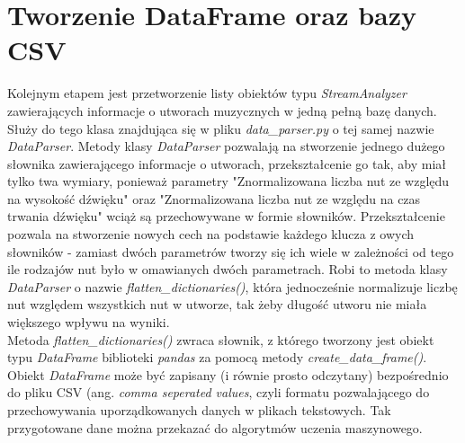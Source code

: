 \documentclass[printmode, eng]{mgr}
\newcommand\tab[1][1cm]{\hspace*{#1}}
\begin{document}
\section{Tworzenie DataFrame oraz bazy CSV}
\tab Kolejnym etapem jest przetworzenie listy obiektów typu \textit{StreamAnalyzer} zawierających informacje o utworach muzycznych w jedną pełną bazę danych. Służy do tego klasa znajdująca się w pliku \textit{data\_parser.py} o tej samej nazwie \textit{DataParser}. Metody klasy \textit{DataParser} pozwalają na stworzenie jednego dużego słownika zawierającego informacje o utworach, przekształcenie go tak, aby miał tylko twa wymiary, ponieważ parametry "Znormalizowana liczba nut ze względu na wysokość dźwięku" oraz "Znormalizowana liczba nut ze względu na czas trwania dźwięku" wciąż są przechowywane w formie słowników. Przekształcenie pozwala na stworzenie nowych cech na podstawie każdego klucza z owych słowników - zamiast dwóch parametrów tworzy się ich wiele w zależności od tego ile rodzajów nut było w omawianych dwóch parametrach. Robi to metoda klasy \textit{DataParser} o nazwie \textit{flatten\_dictionaries()}, która jednocześnie normalizuje liczbę nut względem wszystkich nut w utworze, tak żeby długość utworu nie miała większego wpływu na wyniki.\\
\tab Metoda \textit{flatten\_dictionaries()} zwraca słownik, z którego tworzony jest obiekt typu \textit{DataFrame} biblioteki \textit{pandas} za pomocą metody \textit{create\_data\_frame()}. Obiekt \textit{DataFrame} może być zapisany (i równie prosto odczytany) bezpośrednio do pliku CSV (ang. \textit{comma seperated values}, czyli formatu pozwalającego do przechowywania uporządkowanych danych w plikach tekstowych. Tak przygotowane dane można przekazać do algorytmów uczenia maszynowego.
\end{document}
